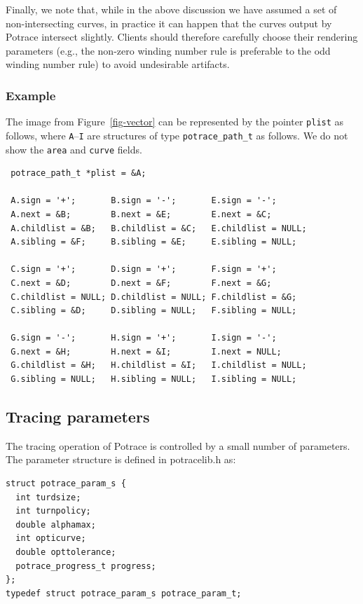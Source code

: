 \documentclass{article}
\begin{document}
Finally, we note that, while in the above discussion we have assumed a
set of non-intersecting curves, in practice it can happen that the
curves output by Potrace intersect slightly. Clients should therefore
carefully choose their rendering parameters (e.g., the non-zero
winding number rule is preferable to the odd winding number rule) to
avoid undesirable artifacts.

\subsubsection{Example}

The image from Figure~\ref{fig-vector} can be represented by the
pointer \verb!plist! as follows, where {\tt A}--{\tt I} are structures
of type \verb!potrace_path_t! as follows.  We do not show the
\verb!area! and \verb!curve! fields.
{\small
\begin{verbatim}
 potrace_path_t *plist = &A;

 A.sign = '+';       B.sign = '-';       E.sign = '-';
 A.next = &B;        B.next = &E;        E.next = &C;
 A.childlist = &B;   B.childlist = &C;   E.childlist = NULL;
 A.sibling = &F;     B.sibling = &E;     E.sibling = NULL;

 C.sign = '+';       D.sign = '+';       F.sign = '+';
 C.next = &D;        D.next = &F;        F.next = &G;
 C.childlist = NULL; D.childlist = NULL; F.childlist = &G;
 C.sibling = &D;     D.sibling = NULL;   F.sibling = NULL;

 G.sign = '-';       H.sign = '+';       I.sign = '-';
 G.next = &H;        H.next = &I;        I.next = NULL;
 G.childlist = &H;   H.childlist = &I;   I.childlist = NULL;
 G.sibling = NULL;   H.sibling = NULL;   I.sibling = NULL;
\end{verbatim}
}

\subsection{Tracing parameters}\label{ssec-parameters}

The tracing operation of Potrace is controlled by a small number of
parameters. The parameter structure is defined in potracelib.h as:

\begin{verbatim}
struct potrace_param_s {
  int turdsize;        
  int turnpolicy;      
  double alphamax;     
  int opticurve;       
  double opttolerance; 
  potrace_progress_t progress; 
};
typedef struct potrace_param_s potrace_param_t;
\end{verbatim}
\end{document}
